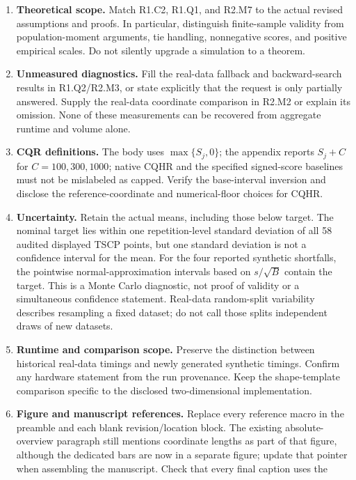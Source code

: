 \documentclass[11pt]{article}
\numberwithin{equation}{section}
\begin{document}
\begin{enumerate}
 \item \textbf{Theoretical scope.} Match R1.C2, R1.Q1, and R2.M7
 to the actual revised assumptions and proofs. In particular,
 distinguish finite-sample validity from population-moment
 arguments, tie handling, nonnegative scores, and positive
 empirical scales. Do not silently upgrade a simulation to
 a theorem.
 \item \textbf{Unmeasured diagnostics.} Fill the real-data
 fallback and backward-search results in R1.Q2/R2.M3, or state
 explicitly that the request is only partially answered.
 Supply the real-data coordinate comparison in R2.M2 or
 explain its omission. None of these measurements can be
 recovered from aggregate runtime and volume alone.
 \item \textbf{CQR definitions.} The body uses
 $\max\{S_j,0\}$; the appendix reports $S_j+C$ for
 $C=100,300,1000$; native CQHR and the specified signed-score
 baselines must not be mislabeled as capped. Verify the
 base-interval inversion and disclose the reference-coordinate
 and numerical-floor choices for CQHR.
 \item \textbf{Uncertainty.} Retain the actual means, including
 those below target. The nominal target lies within one
 repetition-level standard deviation of all 58 audited
 displayed TSCP points, but one standard deviation is not
 a confidence interval for the mean. For the four reported
 synthetic shortfalls, the pointwise normal-approximation
 intervals based on $s/\sqrt B$ contain the target. This
 is a Monte Carlo diagnostic, not proof of validity or a
 simultaneous confidence statement. Real-data random-split
 variability describes resampling a fixed dataset; do not
 call those splits independent draws of new datasets.
 \item \textbf{Runtime and comparison scope.} Preserve the
 distinction between historical real-data timings and newly
 generated synthetic timings. Confirm any hardware statement
 from the run provenance. Keep the shape-template comparison
 specific to the disclosed two-dimensional implementation.
 \item \textbf{Figure and manuscript references.} Replace
 every reference macro in the preamble and each blank
 revision/location block. The existing absolute-overview
 paragraph still mentions coordinate lengths as part of
 that figure, although the dedicated bars are now in a
 separate figure; update that pointer when assembling the
 manuscript. Check that every final caption uses the

\end{enumerate}
\end{document}
